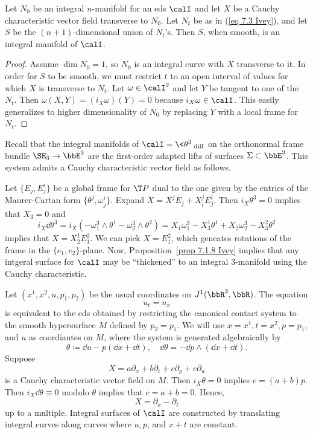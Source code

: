 \begin{prop}\label{prop 7.1.8 Ivey}
    Let $N_0$ be an integral $n$-manifold for an \gls{eds} $\calI$ and let $X$ be a Cauchy characteristic vector field transverse to $N_0$. Let $N_t$ be as in (\ref{eq 7.3 Ivey}), and let $S$ be the $(n+1)$-dimensional union of $N_t$'s. Then $S$, when smooth, is an integral manifold of $\calI$.
\end{prop}
\begin{proof}
    Assume $\dim N_0=1$, so $N_0$ is an integral curve with $X$ transverse to it. In order for $S$ to be smooth, we must restrict $t$ to an open interval of values for which $X$ is transverse to $N_t$. Let $\omega\in\calI^2$ and let $Y$ be tangent to one of the $N_t$. Then $\omega(X,Y)=(i_X\omega)(Y)=0$ because $i_X\omega\in\calI$.  This easily generalizes to higher dimensionality of $N_0$ by replacing $Y$ with a local frame for $N_t$.
\end{proof}

\begin{example}\label{ex 7.1.10 Ivey}
    Recall tbat the integral manifolds of $\calI=\<\theta^3\>_{\mathrm{diff}}$ on the orthonormal frame bundle $\SE_3\to \bbE^3$   are the first-order adapted lifts of surfaces $\Sigma\subset\bbE^3$. This system admits a Cauchy characteristic vector field as follows.

    Let $\{E_j,E^i_j\}$ be a global frame for $\T P$ dual to the one given by the entries of the Maurer-Cartan form $\{\theta^j,\omega^i_j\}$. Expand $X=X^jE_j+X^j_i E^i_j$. Then $i_X\theta^3=0$ implies that $X_3=0$ and 
    \[i_X \dd\theta^3=i_X(-\omega^3_1\wedge\theta^1-\omega^3_2\wedge\theta^2)=X_1\omega^3_1-X^1_3\theta^1+X_2\omega^3_2-X^2_3\theta^2\]
    implies that $X=X^1_2 E^2_1$. We can pick $X=E^2_1$, which geneates rotations of the frame in the $\{e_1,e_2\}$-plane. Now, Proposition~\ref{prop 7.1.8 Ivey} implies that any intgeral surface for $\calI$ may be ``thickened'' to an integral $3$-manifold using the Cauchy characteristic.
\end{example}


\begin{example}
    Let $(x^1,x^2,u,p_1,p_2)$ be the usual coordinates on $J^1(\bbR^2,\bbR)$. The equation 
    \[u_t=u_x\] 
    is equivalent to the \gls{eds} obtained by restricting the canonical contact system to the smooth hypersurface $M$ defined by $p_2=p_1$. We will use $x=x^1,t=x^2,p=p_1$, and $u$ as coordiantes on $M$, where the system is generated algebraically by 
    \[\theta\coloneqq \dd u-p(\dd x+\dd t),\quad \dd\theta=-\dd p\wedge(\dd x+\dd t).\]
    Suppose 
    \[X=a\partial_x+b\partial_t+c\partial_p+e\partial_u\]
    is a Cauchy characteristic vector field on $M$. Then $i_X\theta=0$ implies $e=(a+b)p$. Then $i_X\dd \theta\equiv 0$ modulo $\theta$ implies that $c=a+b=0$. Hence,
    \[X=\partial_x-\partial_t\]
    up to a multiple. Integral surfaces of $\calI$ are constructed by translating integral curves along curves where $u,p$, and $x+t$ are constant.
\end{example}


